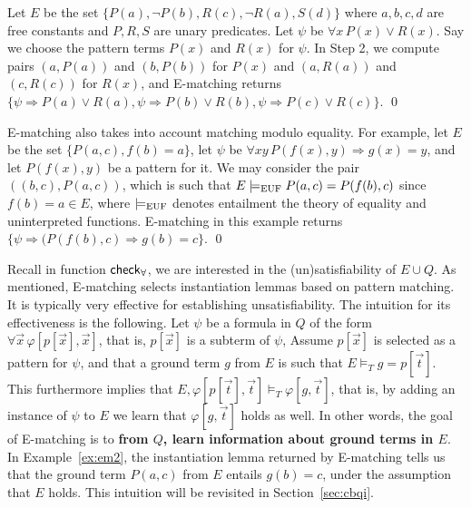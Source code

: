 \documentclass[oribibl]{llncs}
\begin{document}
\begin{example}
\label{ex:em2}
Let $E$ be the set $\{ P(a), \neg P(b), R(c), \neg R(a), S(d) \}$ where $a,b,c,d$ are free constants and $P,R,S$ are unary predicates.
Let $\psi$ be $\forall x\, P( x ) \vee R( x )$.
Say we choose the pattern terms $P( x )$ and $R( x )$ for $\psi$.
In Step 2, we compute pairs $( a, P( a ) )$ and $( b, P( b ) )$ for $P( x )$ and
$( a, R( a ) )$ and $( c, R( c ) )$ for $R( x )$,
and E-matching returns $\{
\psi \Rightarrow P( a ) \vee R( a ), \psi \Rightarrow P( b ) \vee R( b ), \psi \Rightarrow P( c ) \vee R( c )
\}$.
\qed
\end{example}

\begin{example}
\label{ex:em2}
E-matching also takes into account matching modulo equality.
For example, let $E$ be the set $\{ P( a, c ), f( b ) = a \}$,
let $\psi$ be $\forall xy\, P( f( x ), y ) \Rightarrow g( x ) = y$,
and let $P( f( x ), y )$ be a pattern for it.
We may consider the pair $( ( b, c ), P( a, c ) )$, which is such that $E \models_\mathrm{EUF} P( a, c ) = P( f( b ), c )$ since $f( b ) = a \in E$,
where $\models_\mathrm{EUF}$ denotes entailment the theory of equality and uninterpreted functions.
E-matching in this example returns $\{ \psi \Rightarrow ( P( f( b ), c ) \Rightarrow g( b ) = c \}$.
\qed
\end{example}

Recall in function $\small\mathsf{check}_\forall$, we are interested in the (un)satisfiability of $E \cup Q$.
As mentioned, E-matching selects instantiation lemmas based on pattern matching.
It is typically very effective for establishing unsatisfiability.
The intuition for its effectiveness is the following. 
Let $\psi$ be a formula in $Q$ of the form $\forall \vec x\, \varphi[ p[ \vec x ], \vec x ]$, 
that is, $p[ \vec x ]$ is a subterm of $\psi$,
Assume $p[ \vec x ]$ is selected as a pattern for $\psi$, and
that a ground term $g$ from $E$ is such that $E \models_T g = p[ \vec t ]$.
This furthermore implies that $E, \varphi[ p[ \vec t ], \vec t ] \models_T \varphi[ g, \vec t ]$,
that is, by adding an instance of $\psi$ to $E$ we learn that $\varphi[ g, \vec t ]$ holds as well.
In other words, 
the goal of E-matching is to {\bf from $Q$, learn information about ground terms in $E$}.
In Example~\ref{ex:em2}, the instantiation lemma returned by E-matching tells us
that the ground term $P( a, c )$ from $E$ entails $g( b ) = c$, under the assumption that $E$ holds.
This intuition will be revisited in Section~\ref{sec:cbqi}.
\end{document}
